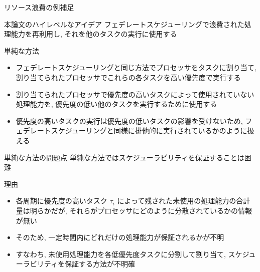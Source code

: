 \begin{frame}{リソース浪費の例補足}
\end{frame}

\begin{frame}{本論文のハイレベルなアイデア}
    フェデレートスケジューリングで浪費された処理能力を再利用し, それを他のタスクの実行に使用する
\end{frame}

\begin{frame}{単純な方法}
    \begin{itemize}
        \item フェデレートスケジューリングと同じ方法でプロセッサをタスクに割り当て, 割り当てられたプロセッサでこれらの各タスクを高い優先度で実行する
        \item 割り当てられたプロセッサで優先度の高いタスクによって使用されていない処理能力を, 優先度の低い他のタスクを実行するために使用する
        \item 優先度の高いタスクの実行は優先度の低いタスクの影響を受けないため, フェデレートスケジューリングと同様に排他的に実行されているかのように扱える
    \end{itemize}
\end{frame}

\begin{frame}{単純な方法の問題点}
    単純な方法ではスケジューラビリティを保証することは困難
    \begin{block}{理由}
        \setlength{\linewidth}{0.98\columnwidth}
        \begin{itemize}
            \item 各周期に優先度の高いタスク $\tau_{i}$ によって残された未使用の処理能力の合計量は明らかだが, それらがプロセッサにどのように分散されているかの情報が無い
            \item そのため, 一定時間内にどれだけの処理能力が保証されるかが不明
            \item すなわち, 未使用処理能力を各低優先度タスクに分割して割り当て, スケジューラビリティを保証する方法が不明確
        \end{itemize}
    \end{block}
\end{frame}

